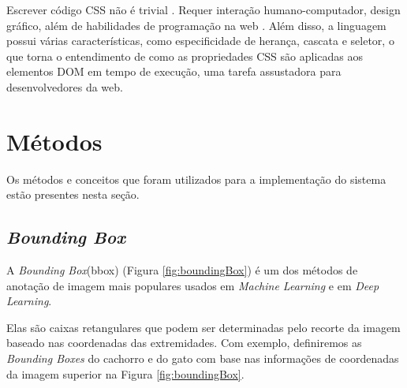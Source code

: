 Escrever código CSS não é trivial \cite{quint2007editing}. Requer interação humano-computador, design gráfico, além de habilidades de programação na web \cite{keller2010css}. Além disso, a linguagem possui várias características, como especificidade de herança, cascata e seletor, o que torna o entendimento de como as propriedades CSS são aplicadas aos elementos DOM em tempo de execução, uma tarefa assustadora para desenvolvedores da web.


\section{Métodos}

Os métodos e conceitos que foram utilizados para a implementação do sistema estão presentes nesta seção.

\subsection{\textit{Bounding Box}}

A \textit{Bounding Box}(bbox) (Figura \ref{fig:boundingBox}) é um dos métodos de anotação de imagem mais populares usados em \textit{Machine Learning} e em \textit{Deep Learning}.

Elas são caixas retangulares que podem ser determinadas pelo recorte da imagem baseado nas coordenadas das extremidades. Com exemplo, definiremos as \textit{Bounding Boxes} do cachorro e do gato com base nas informações de coordenadas da imagem superior na Figura \ref{fig:boundingBox}. \cite{allDeep}

